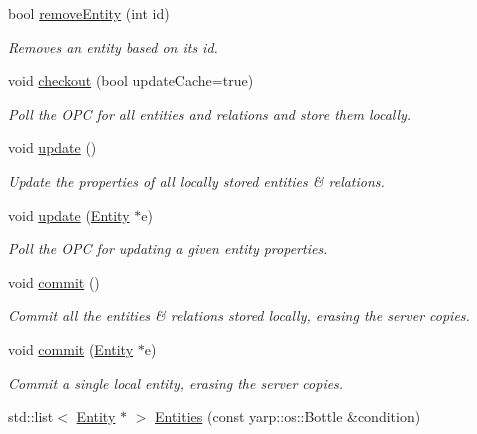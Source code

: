 \begin{DoxyCompactItemize}
bool \hyperlink{group__icubclient__clients_afcb57495b66f77df3aa4991f2a14901e}{remove\+Entity} (int id)
\begin{DoxyCompactList}\small\item\em Removes an entity based on its id. \end{DoxyCompactList}\item 
void \hyperlink{group__icubclient__clients_a5a5bedfa32b8adba9a6ecf1d69745dc5}{checkout} (bool update\+Cache=true)
\begin{DoxyCompactList}\small\item\em Poll the O\+PC for all entities and relations and store them locally. \end{DoxyCompactList}\item 
void \hyperlink{group__icubclient__clients_a1f5e82e93d8d522381cf596d870ccf87}{update} ()
\begin{DoxyCompactList}\small\item\em Update the properties of all locally stored entities \& relations. \end{DoxyCompactList}\item 
void \hyperlink{group__icubclient__clients_ad2b063f232705be47c345e331b2be8fd}{update} (\hyperlink{group__icubclient__representations_classicubclient_1_1Entity}{Entity} $\ast$e)
\begin{DoxyCompactList}\small\item\em Poll the O\+PC for updating a given entity properties. \end{DoxyCompactList}\item 
void \hyperlink{group__icubclient__clients_a79bec5f248fcff8ae539b2cd285950a3}{commit} ()
\begin{DoxyCompactList}\small\item\em Commit all the entities \& relations stored locally, erasing the server copies. \end{DoxyCompactList}\item 
void \hyperlink{group__icubclient__clients_abaec4d0b527ced007679b857446f09ec}{commit} (\hyperlink{group__icubclient__representations_classicubclient_1_1Entity}{Entity} $\ast$e)
\begin{DoxyCompactList}\small\item\em Commit a single local entity, erasing the server copies. \end{DoxyCompactList}\item 
std\+::list$<$ \hyperlink{group__icubclient__representations_classicubclient_1_1Entity}{Entity} $\ast$ $>$ \hyperlink{group__icubclient__clients_af4129eac8888d65d3142b15a7f17909c}{Entities} (const yarp\+::os\+::\+Bottle \&condition)

\end{DoxyCompactItemize}
